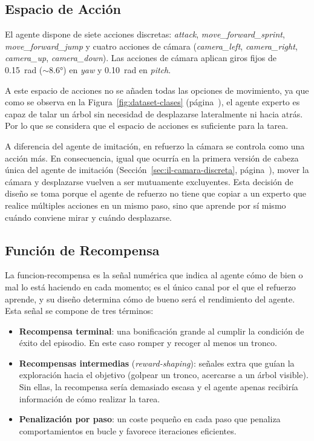 \subsection{Espacio de Acción}
\label{sec:rl-action}
El agente dispone de siete acciones discretas: \textit{attack},
\textit{move\_forward\_sprint}, \textit{move\_forward\_jump} y cuatro acciones de cámara
(\textit{camera\_left}, \textit{camera\_right}, \textit{camera\_up},
\textit{camera\_down}). Las acciones de cámara aplican giros fijos de \qty{0.15}{\radian}
($\sim\ang{8.6}$) en \textit{yaw} y \qty{0.10}{\radian} en \textit{pitch}.

A este espacio de acciones no se añaden todas las opciones de movimiento,
ya que como se observa en la Figura~\ref{fig:dataset-clases} (página~\pageref{fig:dataset-clases}), 
el agente experto es capaz de talar un árbol sin necesidad de desplazarse 
lateralmente ni hacia atrás. Por lo que se considera que el espacio de acciones es suficiente para la tarea.

A diferencia del agente de imitación, en refuerzo la cámara se controla como una acción más.
En consecuencia, igual que ocurría en la primera versión
de cabeza única del agente de imitación (Sección~\ref{sec:il-camara-discreta}, página~\pageref{sec:il-camara-discreta}),
mover la cámara y desplazarse vuelven a ser mutuamente excluyentes.
Esta decisión de diseño se toma porque el agente de refuerzo no tiene que copiar a un experto que realice
múltiples acciones en un mismo paso, sino que aprende por sí mismo cuándo conviene mirar y cuándo desplazarse.

\subsection{Función de Recompensa}
\label{sec:rl-reward}
La \gls{funcion-recompensa} es la señal numérica que indica al agente cómo de bien o mal
lo está haciendo en cada momento; es el único canal por el que el refuerzo aprende, y su
diseño determina cómo de bueno será el rendimiento del agente. Esta señal se compone de tres términos:

\begin{itemize}
  \item \textbf{Recompensa terminal}: una bonificación grande al cumplir la condición de
  éxito del episodio. En este caso romper y recoger al menos un tronco.
  \item \textbf{Recompensas intermedias} (\textit{\gls{reward-shaping}}): señales extra que
  guían la exploración hacia el objetivo (golpear un tronco, acercarse a un árbol
  visible). Sin ellas, la recompensa sería demasiado escasa y el agente apenas 
  recibiría información de cómo realizar la tarea.
  \item \textbf{Penalización por paso}: un coste pequeño en cada paso que penaliza
  comportamientos en bucle y favorece iteraciones eficientes.
\end{itemize}

